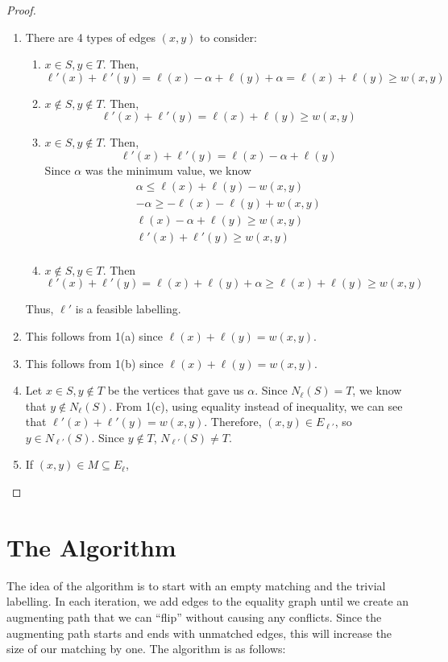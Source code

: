 \documentclass[12pt]{article}
\newcommand{\lskip}{\vspace{\baselineskip}}
\begin{document}
\begin{proof}  $ $\newline
  \begin{enumerate}
    \item There are 4 types of edges $(x,y)$ to consider:
    \begin{enumerate}
      \item $x \in S, y \in T$.
      Then,
      \[ \ell'(x) + \ell'(y) = \ell(x) - \alpha + \ell(y) + \alpha = \ell(x) + \ell(y) \geq w(x,y) \]
      \item $x \notin S, y \notin T$.
      Then,
      \[ \ell'(x) + \ell'(y) = \ell(x) + \ell(y) \geq w(x,y) \]
      \item $x \in S, y \notin T$.
      Then,
      \[ \ell'(x) + \ell'(y) = \ell(x) - \alpha + \ell(y) \]
      Since $\alpha$ was the minimum value, we know
      \begin{align*}
        \alpha \leq \ell(x) + \ell(y) - w(x,y) \\
        -\alpha \geq -\ell(x) - \ell(y) + w(x,y) \\
        \ell(x) - \alpha + \ell(y) \geq w(x,y) \\
        \ell'(x) + \ell'(y) \geq w(x,y) \\
      \end{align*}
      \item $x \notin S, y \in T$. Then
      \[ \ell'(x) + \ell'(y) = \ell(x) + \ell(y) + \alpha \geq \ell(x) + \ell(y) \geq w(x,y) \]
    \end{enumerate}
    Thus, $\ell'$ is a feasible labelling.

    \item This follows from 1(a) since $\ell(x) + \ell(y) = w(x,y)$.
    \item This follows from 1(b) since $\ell(x) + \ell(y) = w(x,y)$.
    \item Let $x \in S, y \notin T$ be the vertices that gave us $\alpha$. Since $N_\ell(S) = T$, we know that $y \notin N_\ell(S)$. From 1(c), using equality instead of inequality, we can see that $\ell'(x) + \ell'(y) = w(x,y)$. Therefore, $(x,y) \in E_{\ell'}$, so $y \in N_{\ell'}(S)$. Since $y \notin T$, $N_{\ell'}(S) \neq T$.
    \item If $(x,y) \in M \subseteq E_\ell$,
  \end{enumerate}
\end{proof}
\lskip

\section*{The Algorithm}
The idea of the algorithm is to start with an empty matching and the trivial labelling. In each iteration, we add edges to the equality graph until we create an augmenting path that we can ``flip'' without causing any conflicts. Since the augmenting path starts and ends with unmatched edges, this will increase the size of our matching by one. The algorithm is as follows:
\end{document}
